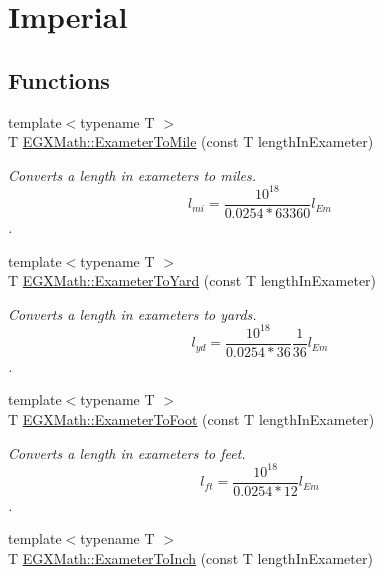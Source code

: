 \hypertarget{group___e_g_x_math-_conversions-_length_conversions-_exameter-_imperial}{}\section{Imperial}
\label{group___e_g_x_math-_conversions-_length_conversions-_exameter-_imperial}
\subsection*{Functions}
\begin{DoxyCompactItemize}
\item 
{\footnotesize template$<$typename T $>$ }\\T \mbox{\hyperlink{group___e_g_x_math-_conversions-_length_conversions-_exameter-_imperial_ga352ae8fb1bf743a0978e3ed05b06b61b}{E\+G\+X\+Math\+::\+Exameter\+To\+Mile}} (const T length\+In\+Exameter)
\begin{DoxyCompactList}\small\item\em Converts a length in exameters to miles. \[ l_{mi}=\frac{10^{18}}{0.0254 * 63360} l_{Em} \]. \end{DoxyCompactList}\item 
{\footnotesize template$<$typename T $>$ }\\T \mbox{\hyperlink{group___e_g_x_math-_conversions-_length_conversions-_exameter-_imperial_gaaa37d3bd7aa2c3a8756ca2e2830bf8ac}{E\+G\+X\+Math\+::\+Exameter\+To\+Yard}} (const T length\+In\+Exameter)
\begin{DoxyCompactList}\small\item\em Converts a length in exameters to yards. \[ l_{yd}= \frac{10^{18}}{0.0254 * 36} \frac{1}{36} l_{Em} \]. \end{DoxyCompactList}\item 
{\footnotesize template$<$typename T $>$ }\\T \mbox{\hyperlink{group___e_g_x_math-_conversions-_length_conversions-_exameter-_imperial_gac6057a24ad10c84b86ec52c9a37f916b}{E\+G\+X\+Math\+::\+Exameter\+To\+Foot}} (const T length\+In\+Exameter)
\begin{DoxyCompactList}\small\item\em Converts a length in exameters to feet. \[ l_{ft}= \frac{10^{18}}{0.0254 * 12} l_{Em} \]. \end{DoxyCompactList}\item 
{\footnotesize template$<$typename T $>$ }\\T \mbox{\hyperlink{group___e_g_x_math-_conversions-_length_conversions-_exameter-_imperial_gabf4408961480eb2b76d2f5c588df128e}{E\+G\+X\+Math\+::\+Exameter\+To\+Inch}} (const T length\+In\+Exameter)

\end{DoxyCompactItemize}

